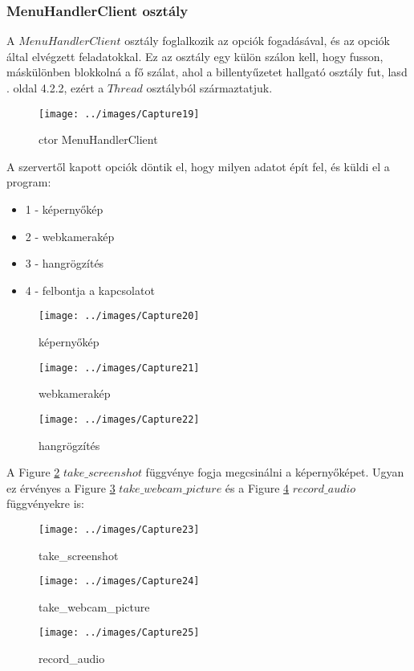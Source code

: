 \documentclass[a4paper, 11pt]{article}
\begin{document}
\subsubsection{MenuHandlerClient osztály}\label{subsubsec:menuhandlerclinet}
A $MenuHandlerClient$ osztály foglalkozik az opciók fogadásával, és az opciók által elvégzett feladatokkal. Ez az osztály egy külön szálon kell, hogy fusson, máskülönben blokkolná a fő szálat, ahol a billentyűzetet hallgató osztály fut, lasd \pageref{subsubsec:keyloggerclientclass}. oldal 4.2.2, ezért a $Thread$ osztályból származtatjuk.
\begin{figure}[H]
\centering
\texttt{[image: ../images/Capture19]}
\caption{ctor MenuHandlerClient}
\label{fig:ctormenuhandlerclient}
\end{figure}
A szervertől kapott opciók döntik el, hogy milyen adatot épít fel, és küldi el a program:
\begin{itemize}
\item 1 - képernyőkép
\item 2 - webkamerakép
\item 3 - hangrögzítés
\item 4 - felbontja a kapcsolatot
\end{itemize}
\begin{figure}[H]
\centering
\texttt{[image: ../images/Capture20]}
\caption{képernyőkép}
\label{fig:image}
\end{figure}
\begin{figure}[H]
\centering
\texttt{[image: ../images/Capture21]}
\caption{webkamerakép}
\label{fig:wcpic}
\end{figure}
\begin{figure}[H]
\centering
\texttt{[image: ../images/Capture22]}
\caption{hangrögzítés}
\label{fig:audio}
\end{figure}

A Figure \ref{fig:image} $take\_screenshot$ függvénye fogja megcsinálni a képernyőképet. Ugyan ez érvényes a Figure \ref{fig:wcpic} $take\_webcam\_picture$ és a Figure \ref{fig:audio} $record\_audio$ függvényekre is:
\begin{figure}[H]
\centering
\texttt{[image: ../images/Capture23]}
\caption{take\_screenshot}
\label{fig:takeimage}
\end{figure}
\begin{figure}[H]
\centering
\texttt{[image: ../images/Capture24]}
\caption{take\_webcam\_picture}
\label{fig:takewcpic}
\end{figure}
\begin{figure}[H]
\centering
\texttt{[image: ../images/Capture25]}
\caption{record\_audio}
\label{fig:recordaud}
\end{figure}
\end{document}

